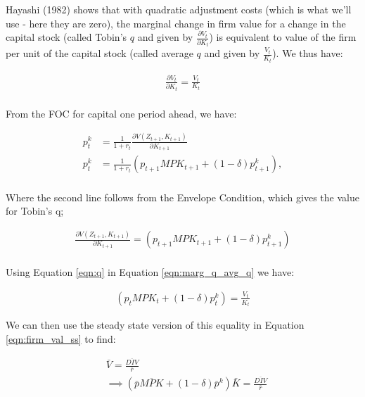\documentclass[letterpaper,12pt]{article}
\theoremstyle{definition}
\begin{document}
\begin{spacing}{1.5}
Hayashi (1982) shows that with quadratic adjustment costs (which is what we'll use - here they are zero), the marginal change in firm value for a change in the capital stock (called Tobin's $q$ and given by $\frac{\partial V_{t}}{\partial K_{t}}$) is equivalent to value of the firm per unit of the capital stock (called average $q$ and given by $\frac{V_{t}}{K_{t}}$).  We thus have:

\begin{equation}
\begin{split}
\label{eqn:marg_q_avg_q}
\frac{\partial V_{t}}{\partial{K_{t}}}=\frac{V_{t}}{K_{t}} \\
\end{split}
\end{equation}

From the FOC for capital one period ahead, we have:

\begin{equation}
\begin{split}
p^{k}_{t} &= \frac{1}{1+r_{t}}\frac{\partial V(Z_{t+1},K_{t+1})}{\partial K_{t+1}} \\
p^{k}_{t} &= \frac{1}{1+r_{t}}\left(p_{t+1}MPK_{t+1} + (1-\delta)p^{k}_{t+1}\right), \\
\end{split}
\end{equation}

\noindent\noindent Where the second line follows from the Envelope Condition, which gives the value for Tobin's q; 

\begin{equation}
\label{eqn:q}
\begin{split}
\frac{\partial V(Z_{t+1},K_{t+1})}{\partial K_{t+1}} = \left(p_{t+1}MPK_{t+1} + (1-\delta)p^{k}_{t+1}\right)\\
\end{split}
\end{equation}

Using Equation \ref{eqn:q} in Equation \ref{eqn:marg_q_avg_q} we have:

\begin{equation}
\label{eqn:q2}
\begin{split}
\left(p_{t}MPK_{t} + (1-\delta)p^{k}_{t}\right) = \frac{V_{t}}{K_{t}}
\end{split}
\end{equation}

We can then use the steady state version of this equality in Equation \ref{eqn:firm_val_ss} to find:

\begin{equation}
\label{eqn:firm_val_ss}
\begin{split}
& \bar{V} = \frac{\overline{DIV}}{\bar{r}} \\
& \implies \left(\bar{p}\overline{MPK} + (1-\delta)\bar{p}^{k}\right)\bar{K} =  \frac{\overline{DIV}}{\bar{r}} \\
\end{split}
\end{equation} 


\end{spacing}
\end{document}
